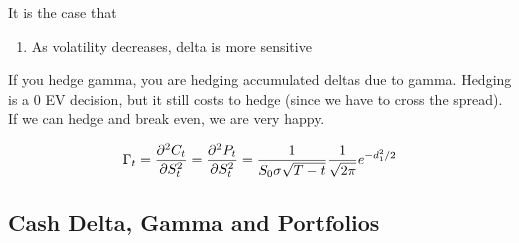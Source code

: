 \documentclass{article}
\begin{document}
    \begin{theorem}
      It is the case that
      \begin{enumerate}
        \item As volatility decreases, delta is more sensitive
      \end{enumerate}
    \end{theorem}

    If you hedge gamma, you are hedging accumulated deltas due to gamma. Hedging is a $0$ EV decision, but it still costs to hedge (since we have to cross the spread). If we can hedge and break even, we are very happy.

    \begin{theorem}
      \begin{equation}
        \Gamma_t = \frac{\partial^2 C_t}{\partial S_t^2} = \frac{\partial^2 P_t}{\partial S_t^2} = \frac{1}{S_0 \sigma \sqrt{T - t}} \frac{1}{\sqrt{2\pi}} e^{- d_1^2 / 2} \\
      \end{equation}
    \end{theorem}

  \subsection{Cash Delta, Gamma and Portfolios}
\end{document}
